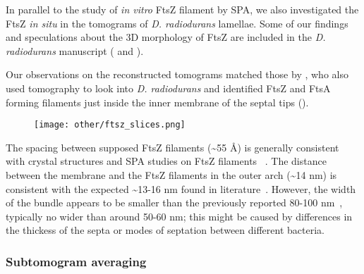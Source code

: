 In parallel to the study of \textit{in vitro} FtsZ filament by SPA, we also investigated the FtsZ \textit{in situ} in the tomograms of \textit{D. radiodurans} lamellae.
Some of our findings and speculations about the 3D morphology of FtsZ are included in the \textit{D. radiodurans} manuscript ( and ).

Our observations on the reconstructed tomograms matched those by \citet{sextonSuperresolutionConfocalCryoCLEM2022}, who also used tomography to look into \textit{D. radiodurans} and identified FtsZ and FtsA forming filaments just inside the inner membrane of the septal tips (). %

\begin{figure}
    \centering
    \texttt{[image: other/ftsz\_slices.png]}
    \label{fig:ftsz_tomo_slice}
\end{figure}

The spacing between supposed FtsZ filaments (\sim55 Å) is generally consistent with crystal structures and SPA studies on FtsZ filaments ~\cite{mcquillenInsightsStructureFunction2020}.
The distance between the membrane and the FtsZ filaments in the outer arch (\sim14 nm) is consistent with the expected \sim13-16 nm found in literature~\cite{mcquillenInsightsStructureFunction2020}.
However, the width of the bundle appears to be smaller than the previously reported 80-100 nm~\cite{mcquillenInsightsStructureFunction2020}, typically no wider than around 50-60 nm; this might be caused by differences in the thickess of the septa or modes of septation between different bacteria.

\subsubsection{Subtomogram averaging}

